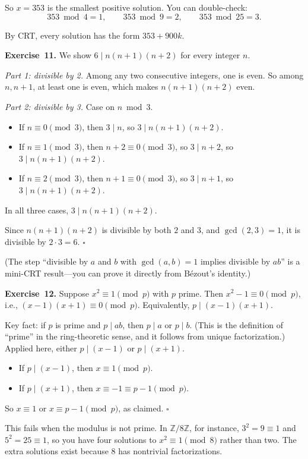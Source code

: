 \documentclass[11pt]{article}
\begin{document}
So $x = 353$ is the smallest positive solution. You can double-check:
\[
  353 \bmod 4 = 1,\qquad
  353 \bmod 9 = 2,\qquad
  353 \bmod 25 = 3.
\]

By CRT, every solution has the form $353 + 900k$.

\medskip
\textbf{Exercise~11.}
We show $6 \mid n(n+1)(n+2)$ for every integer $n$.

\emph{Part 1: divisible by 2.} Among any two consecutive integers, one is even. So among $n, n+1$, at least one is even, which makes $n(n+1)(n+2)$ even.

\emph{Part 2: divisible by 3.} Case on $n \bmod 3$.
\begin{itemize}
  \item If $n \equiv 0 \pmod 3$, then $3 \mid n$, so $3 \mid n(n+1)(n+2)$.
  \item If $n \equiv 1 \pmod 3$, then $n + 2 \equiv 0 \pmod 3$, so $3 \mid n+2$, so $3 \mid n(n+1)(n+2)$.
  \item If $n \equiv 2 \pmod 3$, then $n + 1 \equiv 0 \pmod 3$, so $3 \mid n+1$, so $3 \mid n(n+1)(n+2)$.
\end{itemize}
In all three cases, $3 \mid n(n+1)(n+2)$.

Since $n(n+1)(n+2)$ is divisible by both $2$ and $3$, and $\gcd(2, 3) = 1$, it is divisible by $2 \cdot 3 = 6$. \hfill$\square$

(The step ``divisible by $a$ and $b$ with $\gcd(a,b) = 1$ implies divisible by $ab$'' is a mini-CRT result---you can prove it directly from B\'ezout's identity.)

\medskip
\textbf{Exercise~12.}
Suppose $x^2 \equiv 1 \pmod p$ with $p$ prime. Then $x^2 - 1 \equiv 0 \pmod p$, i.e., $(x - 1)(x + 1) \equiv 0 \pmod p$. Equivalently, $p \mid (x - 1)(x + 1)$.

Key fact: if $p$ is prime and $p \mid ab$, then $p \mid a$ or $p \mid b$. (This is the definition of ``prime'' in the ring-theoretic sense, and it follows from unique factorization.) Applied here, either $p \mid (x - 1)$ or $p \mid (x + 1)$.

\begin{itemize}
  \item If $p \mid (x - 1)$, then $x \equiv 1 \pmod p$.
  \item If $p \mid (x + 1)$, then $x \equiv -1 \equiv p - 1 \pmod p$.
\end{itemize}
So $x \equiv 1$ or $x \equiv p - 1 \pmod p$, as claimed. \hfill$\square$

This fails when the modulus is not prime. In $\mathbb{Z}/8\mathbb{Z}$, for instance, $3^2 = 9 \equiv 1$ and $5^2 = 25 \equiv 1$, so you have four solutions to $x^2 \equiv 1 \pmod 8$ rather than two. The extra solutions exist because $8$ has nontrivial factorizations.
\end{document}
